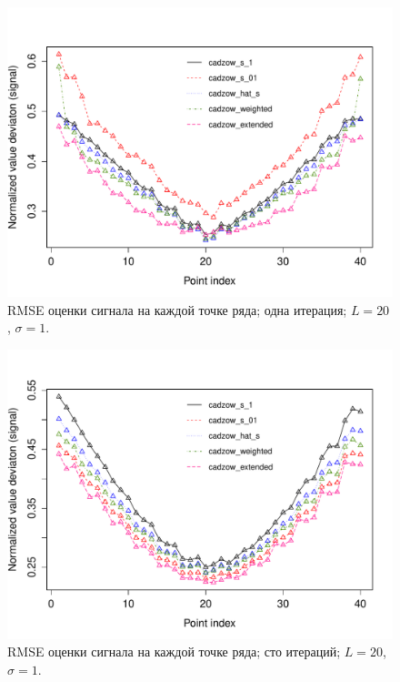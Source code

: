 \documentclass[12pt, specialist, subf,href,colorlinks=true,substylefile = spbu.rtx]{disser}
\theoremstyle{remark}
\theoremstyle{definition}
\begin{document}
\begin{figure}[!hhh]
	\includegraphics[width = \columnwidth]{s1_it1.pdf}
	\caption{RMSE оценки сигнала на каждой точке ряда; одна итерация; $L=20$, $\sigma=1$.}
	\label{fig:s1_it1}
\end{figure}

\begin{figure}[!hhh]
	\includegraphics[width = \columnwidth]{s1_it100.pdf}
	\caption{RMSE оценки сигнала на каждой точке ряда; сто итераций; $L=20$, $\sigma=1$.}
	\label{fig:s1_it100}
\end{figure}
\end{document}
